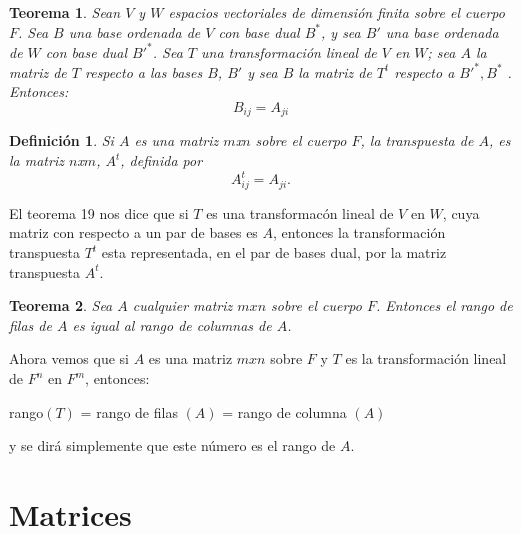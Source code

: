 \documentclass[b5paper, 11pt]{book}
\newcommand{\0}{\mathbf{0}}
\theoremstyle{estiloB}
\theoremstyle{estiloC}
\newtheorem{unteo}{Teorema}[chapter]
\newtheorem{unadefi}{Definición}[chapter]
\theoremstyle{estiloD}
\theoremstyle{estiloE}
\begin{document}
\begin{unteo}
Sean $V$ y $W$ espacios vectoriales de dimensi\'on finita sobre el cuerpo $F$. Sea $B$ una base ordenada de $V$ con base dual $B^{*}$, y sea $B'$ una base ordenada de $W$ con base dual $B'^{*}$. Sea $T$ una transformaci\'on lineal de $V$ en $W$; sea $A$ la matriz de $T$ respecto a las bases $B$, $B'$ y sea $B$ la matriz de $T^{t}$ respecto a $B'^{*} , B^{*}$ . Entonces:
\[
B_{ij} = A_{ji}
\]
\end{unteo}
\begin{unadefi}
Si $A$ es una matriz $m$x$n$ sobre el cuerpo $F$, la \textit{transpuesta} de $A$, es la matriz $n$x$m$, $A^{t}$, definida por
\[
A_{ij}^{t} = A_{ji}.
\]
\end{unadefi}
El teorema 19 nos dice que si $T$ es una transformac\'on lineal de $V$ en $W$, cuya matriz con respecto a un par de bases es $A$, entonces la transformaci\'on transpuesta $T^{t}$ esta representada, en el par de bases dual, por la matriz transpuesta $A^{t}$.

\begin{unteo}
Sea $A$ cualquier matriz $m x n$ sobre el cuerpo $F$. Entonces el rango de filas de $A$ es igual al rango de columnas de $A$.
\end{unteo}
Ahora vemos que si $A$ es una matriz $mxn$ sobre $F$ y $T$ es la transformaci\'on lineal de $F^{n}$ en $F^{m}$, entonces:
\begin{center}
rango$(T)$ = rango de filas $(A)$ = rango de columna $(A)$ 
\end{center}
y se dir\'a simplemente que este n\'umero es el rango de $A$.

\chapter{Matrices}
\end{document}

